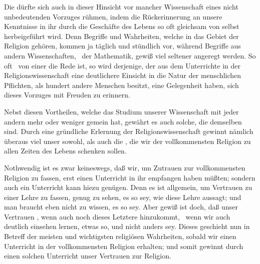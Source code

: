 \begin{aufza}
\begin{aufzb}
\begin{RWanm} 
Die  dürfte sich auch in dieser Hinsicht vor mancher  Wissenschaft eines nicht unbedeutenden Vorzuges rühmen, indem die Rückerinnerung an unsere Kenntnisse in ihr durch die Geschäfte des Lebens so oft gleichsam von selbst herbeigeführt wird. Denn Begriffe und Wahrheiten, welche in das Gebiet der Religion gehören, kommen ja täglich und stündlich vor, während Begriffe aus andern Wissenschaften, \zB\ der Mathematik, gewiß viel seltener angeregt werden. So oft \zB\ von einer  die Rede ist, so wird derjenige, der aus dem Unterrichte in der Religionswissenschaft eine deutlichere Einsicht in die Natur der menschlichen Pflichten, als hundert andere Menschen besitzt, eine Gelegenheit haben, sich dieses Vorzuges mit Freuden zu erinnern.
\end{RWanm}
\end{aufzb}
\item Nebst diesen Vortheilen, welche das Studium unserer Wissenschaft mit jeder andern mehr oder weniger gemein hat, gewährt es auch solche, die demselben  sind. Durch eine gründliche Erlernung der Religionswissenschaft gewinnt nämlich überaus viel unser  sowohl, als auch die , die wir der vollkommensten Religion zu allen Zeiten des Lebens schenken sollen.
\begin{aufzb}
\item Nothwendig ist es zwar keineswegs, daß wir, um Zutrauen zur vollkommensten Religion zu fassen, erst einen  Unterricht in ihr empfangen haben müßten; sondern auch ein  Unterricht kann hiezu genügen. Denn es ist allgemein, um Vertrauen zu einer Lehre zu fassen, genug zu sehen,  es so sey, wie diese Lehre aussagt; und man braucht eben nicht zu wissen,  es so sey. Aber gewiß ist doch, daß unser Vertrauen , wenn auch noch dieses Letztere hinzukommt, \dh\ wenn wir auch deutlich einsehen lernen,  etwas so, und nicht anders sey. Dieses geschieht nun in Betreff der meisten und wichtigsten religiösen Wahrheiten, sobald wir einen  Unterricht in der vollkommensten Religion erhalten; und somit gewinnt durch einen solchen Unterricht unser Vertrauen zur Religion. 

\end{aufzb}
\end{aufza}
